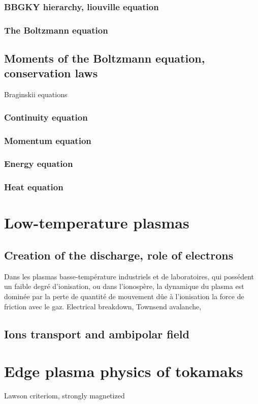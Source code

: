 			\subsubsection{BBGKY hierarchy, liouville equation}
			\subsubsection{The Boltzmann equation}
		\subsection{Moments of the Boltzmann equation, conservation laws}
			Braginskii equations
			\subsubsection{Continuity equation}
			\subsubsection{Momentum equation}
			\subsubsection{Energy equation}
			\subsubsection{Heat equation}
	\section{Low-temperature plasmas}
		\subsection{Creation of the discharge, role of electrons}
		Dans les plasmas basse-température industriels et de laboratoires, qui possédent
			un faible degré d'ionisation, ou dans l'ionospère, la dynamique du plasma est dominée par
			la perte de quantité de mouvement dûe à l'ionisation la force de friction avec le gaz.
		Electrical breakdown, Townsend avalanche, 
		\subsection{Ions transport and ambipolar field}
	\section{Edge plasma physics of tokamaks}
		Lawson criteriom, strongly magnetized
